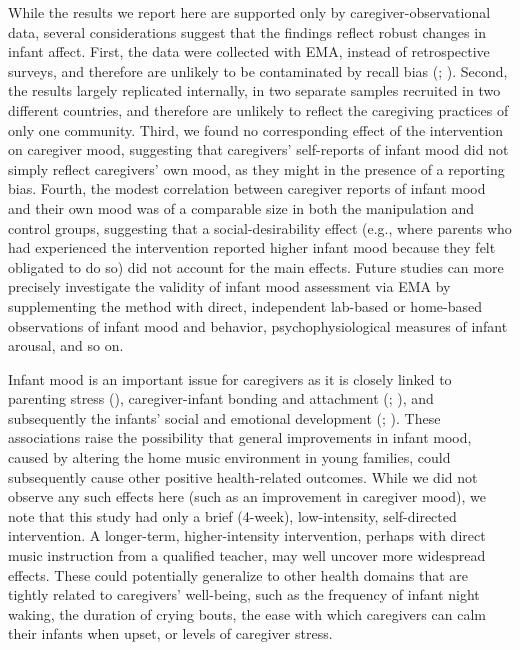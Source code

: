 \documentclass[
]{article}
\begin{document}
While the results we report here are supported only by
caregiver-observational data, several considerations suggest that the
findings reflect robust changes in infant affect. First, the data were
collected with EMA, instead of retrospective surveys, and therefore are
unlikely to be contaminated by recall bias
(;
). Second, the results largely
replicated internally, in two separate samples recruited in two
different countries, and therefore are unlikely to reflect the
caregiving practices of only one community. Third, we found no
corresponding effect of the intervention on caregiver mood, suggesting
that caregivers' self-reports of infant mood did not simply reflect
caregivers' own mood, as they might in the presence of a reporting bias.
Fourth, the modest correlation between caregiver reports of infant mood
and their own mood was of a comparable size in both the manipulation and
control groups, suggesting that a social-desirability effect (e.g.,
where parents who had experienced the intervention reported higher
infant mood because they felt obligated to do so) did not account for
the main effects. Future studies can more precisely investigate the
validity of infant mood assessment via EMA by supplementing the method
with direct, independent lab-based or home-based observations of infant
mood and behavior, psychophysiological measures of infant arousal, and
so on.

Infant mood is an important issue for caregivers as it is closely linked
to parenting stress (),
caregiver-infant bonding and attachment (; ), and
subsequently the infants' social and emotional development
(;
). These associations raise
the possibility that general improvements in infant mood, caused by
altering the home music environment in young families, could
subsequently cause other positive health-related outcomes. While we did
not observe any such effects here (such as an improvement in caregiver
mood), we note that this study had only a brief (4-week), low-intensity,
self-directed intervention. A longer-term, higher-intensity
intervention, perhaps with direct music instruction from a qualified
teacher, may well uncover more widespread effects. These could
potentially generalize to other health domains that are tightly related
to caregivers' well-being, such as the frequency of infant night waking,
the duration of crying bouts, the ease with which caregivers can calm
their infants when upset, or levels of caregiver stress.
\end{document}
